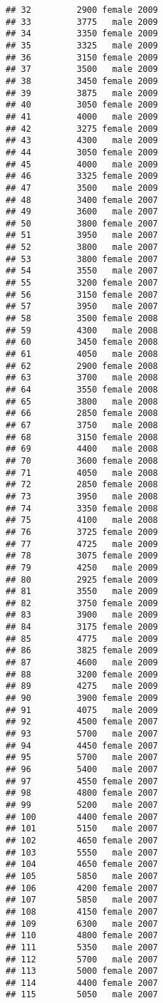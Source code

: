 \documentclass[
]{article}
\begin{document}
\begin{verbatim}
## 32         2900 female 2009
## 33         3775   male 2009
## 34         3350 female 2009
## 35         3325   male 2009
## 36         3150 female 2009
## 37         3500   male 2009
## 38         3450 female 2009
## 39         3875   male 2009
## 40         3050 female 2009
## 41         4000   male 2009
## 42         3275 female 2009
## 43         4300   male 2009
## 44         3050 female 2009
## 45         4000   male 2009
## 46         3325 female 2009
## 47         3500   male 2009
## 48         3400 female 2007
## 49         3600   male 2007
## 50         3800 female 2007
## 51         3950   male 2007
## 52         3800   male 2007
## 53         3800 female 2007
## 54         3550   male 2007
## 55         3200 female 2007
## 56         3150 female 2007
## 57         3950   male 2007
## 58         3500 female 2008
## 59         4300   male 2008
## 60         3450 female 2008
## 61         4050   male 2008
## 62         2900 female 2008
## 63         3700   male 2008
## 64         3550 female 2008
## 65         3800   male 2008
## 66         2850 female 2008
## 67         3750   male 2008
## 68         3150 female 2008
## 69         4400   male 2008
## 70         3600 female 2008
## 71         4050   male 2008
## 72         2850 female 2008
## 73         3950   male 2008
## 74         3350 female 2008
## 75         4100   male 2008
## 76         3725 female 2009
## 77         4725   male 2009
## 78         3075 female 2009
## 79         4250   male 2009
## 80         2925 female 2009
## 81         3550   male 2009
## 82         3750 female 2009
## 83         3900   male 2009
## 84         3175 female 2009
## 85         4775   male 2009
## 86         3825 female 2009
## 87         4600   male 2009
## 88         3200 female 2009
## 89         4275   male 2009
## 90         3900 female 2009
## 91         4075   male 2009
## 92         4500 female 2007
## 93         5700   male 2007
## 94         4450 female 2007
## 95         5700   male 2007
## 96         5400   male 2007
## 97         4550 female 2007
## 98         4800 female 2007
## 99         5200   male 2007
## 100        4400 female 2007
## 101        5150   male 2007
## 102        4650 female 2007
## 103        5550   male 2007
## 104        4650 female 2007
## 105        5850   male 2007
## 106        4200 female 2007
## 107        5850   male 2007
## 108        4150 female 2007
## 109        6300   male 2007
## 110        4800 female 2007
## 111        5350   male 2007
## 112        5700   male 2007
## 113        5000 female 2007
## 114        4400 female 2007
## 115        5050   male 2007

\end{verbatim}
\end{document}
